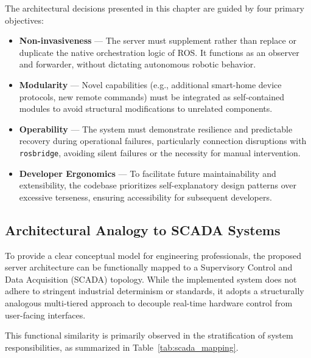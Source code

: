The architectural decisions presented in this chapter are guided by four primary objectives:

\begin{itemize}
    \item \textbf{Non-invasiveness} — The server must supplement rather than replace or duplicate the native orchestration logic of ROS. It functions as an observer and forwarder, without dictating autonomous robotic behavior.
    \item \textbf{Modularity} — Novel capabilities (e.g., additional smart-home device protocols, new remote commands) must be integrated as self-contained modules to avoid structural modifications to unrelated components.
    \item \textbf{Operability} — The system must demonstrate resilience and predictable recovery during operational failures, particularly connection disruptions with \texttt{rosbridge}, avoiding silent failures or the necessity for manual intervention.
    \item \textbf{Developer Ergonomics} — To facilitate future maintainability and extensibility, the codebase prioritizes self-explanatory design patterns over excessive terseness, ensuring accessibility for subsequent developers.
\end{itemize}

\subsection{Architectural Analogy to SCADA Systems}
\label{sec:ch8_scada}

To provide a clear conceptual model for engineering professionals, the proposed server architecture can be functionally mapped to a Supervisory Control and Data Acquisition (SCADA) topology. While the implemented system does not adhere to stringent industrial determinism or standards, it adopts a structurally analogous multi-tiered approach to decouple real-time hardware control from user-facing interfaces.

This functional similarity is primarily observed in the stratification of system responsibilities, as summarized in Table~\ref{tab:scada_mapping}.

